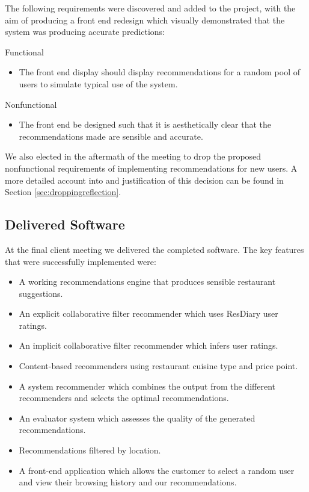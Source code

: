 \documentclass{l3proj}
\begin{document}
The following requirements were discovered and added to the project, with the aim of producing a front end redesign which visually demonstrated that the system was producing accurate predictions:

Functional
\begin{itemize}
\item The front end display should display recommendations for a random pool of users to simulate typical use of the system.
\end{itemize}

Nonfunctional
\begin{itemize}
\item The front end be designed such that it is aesthetically clear that the recommendations made are sensible and accurate.
\end{itemize}

We also elected in the aftermath of the meeting to drop the proposed nonfunctional requirements of implementing recommendations for new users. A more detailed account into and justification of this decision can be found in Section \ref{sec:droppingreflection}.

\subsection{Delivered Software}
\label{sec:finsoftware}

At the final client meeting we delivered the completed software. The key features that were successfully implemented were:

\begin{itemize}
\item A working recommendations engine that produces sensible restaurant suggestions. 
\item An explicit collaborative filter recommender which uses ResDiary user ratings.
\item An implicit collaborative filter recommender which infers user ratings.
\item Content-based recommenders using restaurant cuisine type and price point.
\item A system recommender which combines the output from the different recommenders and selects the optimal recommendations.
\item An evaluator system which assesses the quality of the generated recommendations.
\item Recommendations filtered by location. 
\item A front-end application which allows the customer to select a random user and view their browsing history and our recommendations.
\end{itemize}
\end{document}
